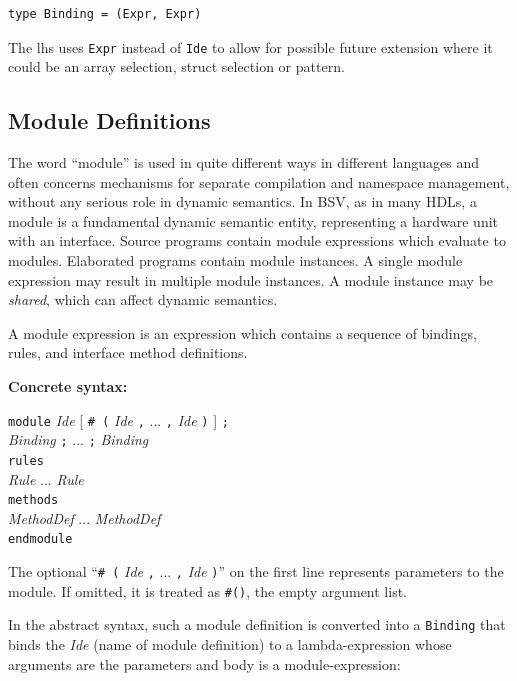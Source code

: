 \documentclass[11pt]{article}
\newcommand{\hm}{\hspace*{1em}}
\newcommand{\hmm}{\hspace*{2em}}
\newcommand{\nterm}[1]{\emph{#1}}
\newcommand{\term}[1]{\texttt{#1}}
\newcommand{\many}[2]{#1 #2 ... #2 #1}
\newcommand{\opt}[1]{[ #1 ]}
\newcommand{\gram}[2]{    \hm\makebox[10em][l]{\it #1}\makebox[1.5em][l]{::=}    #2}
\newcommand{\grammore}[1]{\hm\makebox[10em][l]{      }\makebox[1.5em][l]{}       #1}
\begin{document}
\begin{Verbatim}[frame=single, commandchars=\\\{\}]
type Binding = (Expr, Expr)
\end{Verbatim}

The lhs uses \term{Expr} instead of \term{Ide} to allow for possible
future extension where it could be an array selection, struct
selection or pattern.


\subsection{Module Definitions}

\label{sec_syntax_module_definitions}

The word ``module'' is used in quite different ways in different
languages and often concerns mechanisms for separate compilation and
namespace management, without any serious role in dynamic semantics.
In BSV, as in many HDLs, a module is a fundamental dynamic semantic
entity, representing a hardware unit with an interface.  Source
programs contain module expressions which evaluate to modules.
Elaborated programs contain module instances.  A single module
expression may result in multiple module instances.  A module instance
may be \emph{shared}, which can affect dynamic semantics.

A module expression is an expression which contains a sequence of
bindings, rules, and interface method definitions.

{\bf Concrete syntax:}

\gram{ModuleDefinition}{\term{module} \nterm{Ide} \opt{\term{\# (} \many{\nterm{Ide}}{\term{,}} \term{)}} \term{;}} \\
\grammore{\hmm \many{\nterm{Binding}}{\term{;}}} \\
\grammore{\hm \term{rules}} \\
\grammore{\hmm \many{\nterm{Rule}}{\hm}} \\
\grammore{\hm \term{methods}} \\
\grammore{\hmm \many{\nterm{MethodDef}}{\hm}} \\
\grammore{\term{endmodule}}

The optional ``\term{\# (} \many{\nterm{Ide}}{\term{,}} \term{)}'' on
the first line represents parameters to the module.  If omitted, it is
treated as \term{\#()}, the empty argument list.

In the abstract syntax, such a module definition is converted into a
\term{Binding} that binds the \nterm{Ide} (name of module definition)
to a lambda-expression whose arguments are the parameters and body is
a module-expression:
\end{document}
